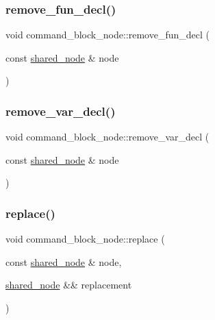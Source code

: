 \mbox{\label{classjawe_1_1command__block__node_a092957384e4095db729dc4f032676e59}} 
\subsubsection{\texorpdfstring{remove\+\_\+fun\+\_\+decl()}{remove\_fun\_decl()}}
{\footnotesize\ttfamily void command\+\_\+block\+\_\+node\+::remove\+\_\+fun\+\_\+decl (\begin{DoxyParamCaption}\item[{const \hyperlink{namespacejawe_a3f307481d921b6cbb50cc8511fc2b544}{shared\+\_\+node} \&}]{node }\end{DoxyParamCaption})}

\mbox{\label{classjawe_1_1command__block__node_ae06b2258671be36bbd1401c53363e9b4}} 
\subsubsection{\texorpdfstring{remove\+\_\+var\+\_\+decl()}{remove\_var\_decl()}}
{\footnotesize\ttfamily void command\+\_\+block\+\_\+node\+::remove\+\_\+var\+\_\+decl (\begin{DoxyParamCaption}\item[{const \hyperlink{namespacejawe_a3f307481d921b6cbb50cc8511fc2b544}{shared\+\_\+node} \&}]{node }\end{DoxyParamCaption})}

\mbox{\label{classjawe_1_1command__block__node_a0a4f2c34d319286001d2ac7992d310df}} 
\subsubsection{\texorpdfstring{replace()}{replace()}}
{\footnotesize\ttfamily void command\+\_\+block\+\_\+node\+::replace (\begin{DoxyParamCaption}\item[{const \hyperlink{namespacejawe_a3f307481d921b6cbb50cc8511fc2b544}{shared\+\_\+node} \&}]{node,  }\item[{\hyperlink{namespacejawe_a3f307481d921b6cbb50cc8511fc2b544}{shared\+\_\+node} \&\&}]{replacement }\end{DoxyParamCaption})}



